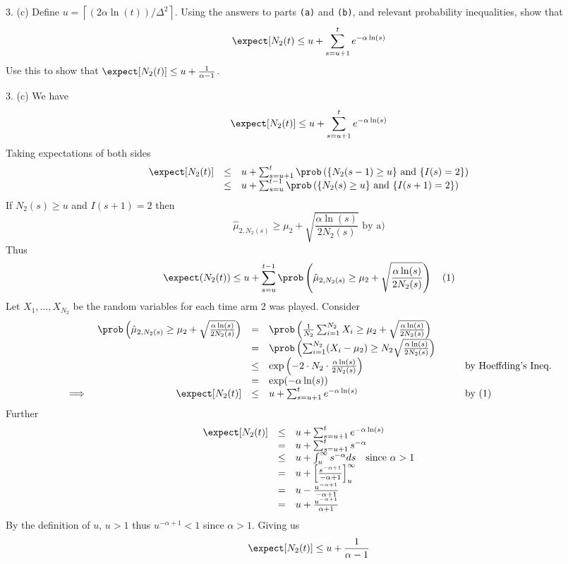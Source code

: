 \documentclass[11pt,a4paper]{article}
\begin{document}
\begin{question}{3. (c)}
  Define $u=\left\lceil(2\alpha\ln(t))/\Delta^2\right\rceil$. Using the answers to parts \texttt{(a)} and \texttt{(b)}, and relevant probability inequalities, show that
  \[ \expect[N_2(t)\leq u+\sum_{s=u+1}^te^{-\alpha\ln(s)} \]
  Use this to show that $\expect[N_2(t)]\leq u+\frac1{\alpha-1}$.
\end{question}

\begin{answer}{3. (c)}
  We have
  \[ \expect[N_2(t)]\leq u+\sum_{s=u+1}^te^{-\alpha\ln(s)} \]
  Taking expectations of both sides
  \[\begin{array}{rcl}
  \expect[N_2(t)]&\leq&u+\sum_{s=u+1}^t\prob\left(\{N_2(s-1)\geq u\}\text{ and }\{I(s)=2\}\right)\\
  &\leq&u+\sum_{s=u}^{t-1}\prob\left(\{N_2(s)\geq u\}\text{ and }\{I(s+1)=2\}\right)
  \end{array}\]
  If $N_2(s)\geq u$ and $I(s+1)=2$ then
  \[ \hat\mu_{2,N_2(s)}\geq\mu_2+\sqrt{\frac{\alpha\ln(s)}{2N_2(s)}}\text{ by a)} \]
  Thus
  \[ \expect(N_2(t))\leq u+\sum_{s=u}^{t-1}\prob\left(\hat\mu_{2,N_2(s)}\geq\mu_2+\sqrt{\frac{\alpha\ln(s)}{2N_2(s)}}\right)\quad(1) \]
  Let $X_1,\dots,X_{N_2}$ be the random variables for each time arm 2 was played. Consider
  \[\begin{array}{rrclcl}
  &\prob\left(\hat\mu_{2,N_2(s)}\geq\mu_2+\sqrt{\frac{\alpha\ln(s)}{2N_2(s)}}\right)&=&\prob\left(\frac{1}{N_2}\sum_{i=1}^{N_2}X_i\geq\mu_2+\sqrt{\frac{\alpha\ln(s)}{2N_2(s)}}\right)&\quad&\\
  &&=&\prob\left(\sum_{i=1}^{N_2}(X_i-\mu_2)\geq N_2\sqrt{\frac{\alpha\ln(s)}{2N_2(s)}}\right)\\
  &&\leq&\text{exp}\left(-2\cdot N_2\cdot\frac{\alpha\ln(s)}{2N_2(s)}\right)&&\text{by Hoeffding's Ineq.}\\
  &&=&\text{exp}(-\alpha\ln(s))\\
  \implies&\expect[N_2(t)]&\leq&u+\sum_{s=u+1}^te^{-\alpha\ln(s)}&&\text{by (1)}
  \end{array}\]
  Further
  \[\begin{array}{rcl}
    \expect[N_2(t)]&\leq&u+\sum_{s=u+1}^te^{-\alpha\ln(s)}\\
    &=&u+\sum_{s=u+1}^ts^{-\alpha}\\
    &\leq&u+\int_u^\infty s^{-\alpha}ds\quad\text{since }\alpha>1\\
    &=&u+\left[\frac{s^{-\alpha+1}}{-\alpha+1}\right]_u^\infty\\
    &=&u-\frac{u^{-\alpha+1}}{-\alpha+1}\\
    &=&u+\frac{u^{-\alpha+1}}{\alpha+1}
  \end{array}\]
  By the definition of $u$, $u>1$ thus $u^{-\alpha+1}<1$ since $\alpha>1$. Giving us
  \[ \expect[N_2(t)]\leq u+\frac1{\alpha-1} \]
\end{answer}
\end{document}
